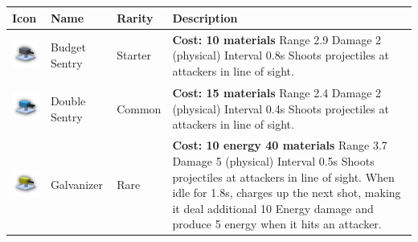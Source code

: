 \begin{table}[H]
    \centering
    \begin{tabular}{m{15mm}m{20mm}lm{}}
        \toprule
        \textbf{Icon}                                                     & \textbf{Name} & \textbf{Rarity} & \textbf{Description}                                                                                                                                                                                                              \\
        \midrule
        \includegraphics[height=15mm]{img/Icons/Towers/Budget Sentry.png} & Budget Sentry & Starter         &
        \footnotesize{\textbf{Cost: 10 materials} \newline Range 2.9 \newline Damage 2 (physical) \newline Interval 0.8s \newline Shoots projectiles at attackers in line of sight.}                                                                                                                                                            \\

        \includegraphics[height=15mm]{img/Icons/Towers/Double Sentry.png} & Double Sentry & Common          &
        \footnotesize{\textbf{Cost: 15 materials} \newline Range 2.4 \newline Damage 2 (physical) \newline Interval 0.4s \newline Shoots projectiles at attackers in line of sight.}                                                                                                                                                            \\

        \includegraphics[height=15mm]{img/Icons/Towers/Galvanizer.png}    & Galvanizer    & Rare            &
        \footnotesize{\textbf{Cost: 10 energy 40 materials} \newline Range 3.7 \newline Damage 5 (physical) \newline Interval 0.5s \newline Shoots projectiles at attackers in line of sight. \newline When idle for 1.8s, charges up the next shot, making it deal additional 10 Energy damage and produce 5 energy when it hits an attacker.} \\


\end{tabular}
\end{table}
